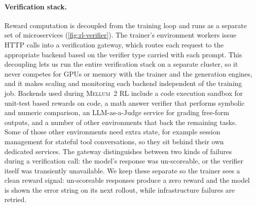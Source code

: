 \documentclass[11pt,a4paper]{article}
\newcommand{\modelname}{\textsc{Mellum~2}\xspace}
\begin{document}
\paragraph{Verification stack.}
Reward computation is decoupled from the training loop and runs as a
separate set of microservices (\cref{fig:rl-verifier}). The trainer's
environment workers issue HTTP calls into a verification gateway, which
routes each request to the appropriate backend based on the verifier
type carried with each prompt. This decoupling lets us run the entire
verification stack on a separate cluster, so it never competes for GPUs
or memory with the trainer and the generation engines, and it makes
scaling and monitoring each backend independent of the training job.
Backends used during \modelname{} RL include a code execution sandbox
for unit-test based rewards on code, a math answer verifier that
performs symbolic and numeric comparison, an LLM-as-a-Judge service for
grading free-form outputs, and a number of other environments that back
the remaining tasks. Some of those other environments need extra state,
for example session management for stateful tool conversations, so they
sit behind their own dedicated services. The gateway distinguishes
between two kinds of failures during a verification call: the model's
response was un-scoreable, or the verifier itself was transiently
unavailable. We keep these separate so the trainer sees a clean reward
signal: un-scoreable responses produce a zero reward and the model is
shown the error string on its next rollout, while infrastructure
failures are retried.
\end{document}

